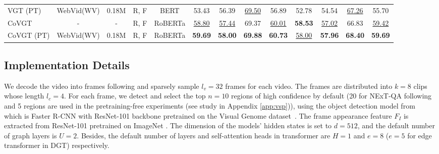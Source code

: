 \documentclass[10pt,journal,compsoc]{IEEEtran}
\begin{document}
\begin{table*}[t]
{\begin{tabular}{l|cc|c|c|ccc|c|ccc|c}
    VGT (PT)  & WebVid(WV) & 0.18M &R, F &BERT & 53.43 & 56.39 & \underline{69.50} & 56.89 & 52.78 & 54.54 & \underline{67.26} & 55.70 \\
    CoVGT & - & - &R, F &RoBERTa & \underline{58.80} & \underline{57.44} & 69.37 & \underline{60.01} & {\bf58.53} & \underline{57.02} & 66.83 & \underline{59.42} \\
    CoVGT (PT) & WebVid(WV) & 0.18M &R, F &RoBERTa & {\bf59.69} & {\bf58.00} & {\bf69.88} & {\bf60.73} & \underline{58.00} & {\bf57.96} & {\bf68.40} & {\bf59.69} \\
    \hline
    \end{tabular}
    }
    \label{tab:resnextqa}
    \vspace{-0.5em}
\end{table*}
\subsection{Implementation Details}
We decode the video into frames following \cite{xiao2021video} and sparsely sample $l_v=32$ frames for each video. The frames are distributed into $k=8$ clips whose length $l_c=4$. For each frame, we detect and select the top $n\!=\!10$ regions of high confidence by default (20 for NExT-QA following \cite{xiao2021video} and 5 regions are used in the pretraining-free experiments (see study in Appendix \ref{app:vsp})), using the object detection model from~\cite{anderson2018bottom} which is Faster R-CNN with ResNet-101 backbone pretrained on the Visual Genome dataset~\cite{krishna2017visual}. The frame appearance feature $F_I$ is extracted from ResNet-101 pretrained on ImageNet \cite{russakovsky2015imagenet}. The dimension of the models' hidden states is set to $d=512$, and the default number of graph layers is $U=2$. Besides, the default number of layers and self-attention heads in transformer are $H=1$ and $e=8$ ($e=5$ for edge transformer in DGT) respectively.
\end{document}
